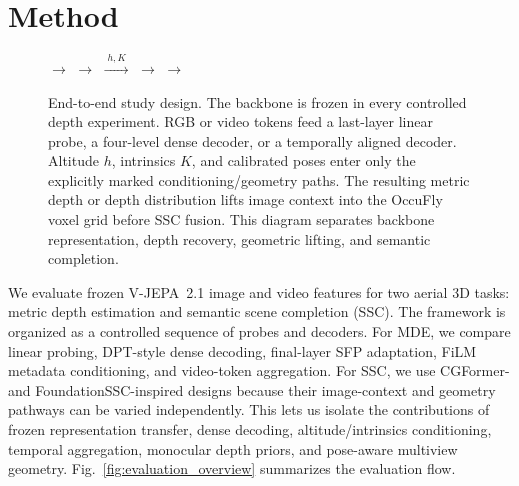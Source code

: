 \section{Method}
\label{sec:method}

\begin{figure}[t]
\centering
\setlength{\fboxsep}{5pt}
\small
{}
$\longrightarrow$
$\longrightarrow$
$\xrightarrow{\;h,K\;}$
$\longrightarrow$
$\longrightarrow$
\caption{End-to-end study design. The backbone is frozen in every controlled depth experiment. RGB or video tokens feed a last-layer linear probe, a four-level dense decoder, or a temporally aligned decoder. Altitude $h$, intrinsics $K$, and calibrated poses enter only the explicitly marked conditioning/geometry paths. The resulting metric depth or depth distribution lifts image context into the OccuFly voxel grid before SSC fusion. This diagram separates backbone representation, depth recovery, geometric lifting, and semantic completion.}
\label{fig:end_to_end_overview}
\end{figure}

We evaluate frozen V-JEPA~2.1 image and video features for two aerial 3D tasks: metric depth estimation and semantic scene completion (SSC). The framework is organized as a controlled sequence of probes and decoders. For MDE, we compare linear probing, DPT-style dense decoding, final-layer SFP adaptation, FiLM metadata conditioning, and video-token aggregation. For SSC, we use CGFormer- and FoundationSSC-inspired designs because their image-context and geometry pathways can be varied independently. This lets us isolate the contributions of frozen representation transfer, dense decoding, altitude/intrinsics conditioning, temporal aggregation, monocular depth priors, and pose-aware multiview geometry. Fig.~\ref{fig:evaluation_overview} summarizes the evaluation flow.


